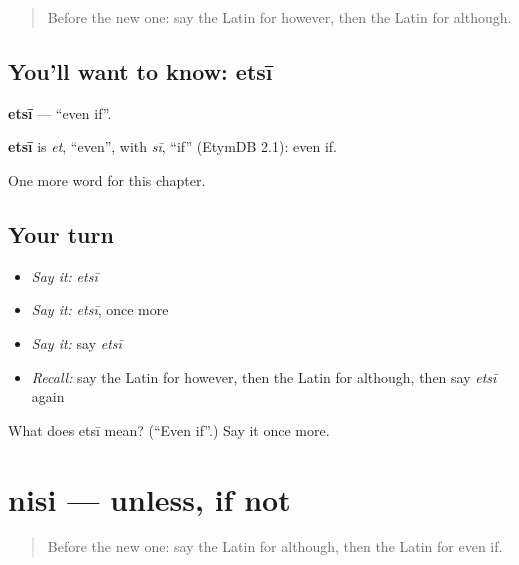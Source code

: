 \label{lesson:LA-C178-etsi}



\begin{quote}
Before the new one: say the Latin for however, then the Latin for although.
\end{quote}

\subsection*{You'll want to know: etsī}
\textbf{etsī} — \textquotedblleft{}even if\textquotedblright{}.

\begin{cousinweb}
\textbf{etsī} is \emph{et}, \textquotedblleft{}even\textquotedblright{}, with \emph{sī}, \textquotedblleft{}if\textquotedblright{} (EtymDB 2.1): even if.
\end{cousinweb}

\begin{grammarlens}[title={What you've built}]
One more word for this chapter.
\end{grammarlens}

\subsection*{Your turn}
\begin{itemize}
\raggedright
  \item \emph{Say it:} \emph{etsī}
  \item \emph{Say it:} \emph{etsī}, once more
  \item \emph{Say it:} say \emph{etsī}
  \item \emph{Recall:} say the Latin for however, then the Latin for although, then say \emph{etsī} again
\end{itemize}

\begin{tcolorbox}[breakable,colback=teal!4,colframe=teal!35!black,title={Before you move on}]
What does etsī mean? (\textquotedblleft{}Even if\textquotedblright{}.) Say it once more.
\end{tcolorbox}
\section[nisi]{nisi — unless, if not}

\label{lesson:LA-C178-nisi}



\begin{quote}
Before the new one: say the Latin for although, then the Latin for even if.
\end{quote}

